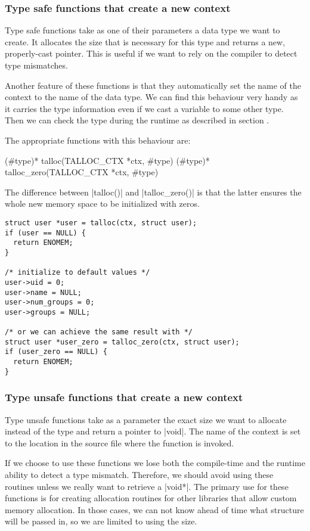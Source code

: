 \subsubsection{Type safe functions that create a new context}

Type safe functions take as one of their parameters a data type we want to
create. It allocates the size that is necessary for this type and returns a
new, properly-cast pointer. This is useful if we want to rely on the compiler
to detect type mismatches.

Another feature of these functions is that they automatically set the name of
the context to the name of the data type. We can find this behaviour very handy
as it carries the type information even if we cast a variable to some other
type. Then we can check the type during the runtime as described in section
.

The appropriate functions with this behaviour are:

\begin{funcproto}
(#type)* talloc(TALLOC_CTX *ctx, #type)
(#type)* talloc_zero(TALLOC_CTX *ctx, #type)
\end{funcproto}
\funclistend
The difference between |talloc()| and |talloc_zero()| is that the latter ensures
the whole new memory space to be initialized with zeros.

\begin{lstlisting}[caption={talloc() and talloc_zero()},label=lst:talloc_zero]
struct user *user = talloc(ctx, struct user);
if (user == NULL) {
  return ENOMEM;
}

/* initialize to default values */
user->uid = 0;
user->name = NULL;
user->num_groups = 0;
user->groups = NULL;

/* or we can achieve the same result with */
struct user *user_zero = talloc_zero(ctx, struct user);
if (user_zero == NULL) {
  return ENOMEM;
}
\end{lstlisting}

\subsubsection{Type unsafe functions that create a new context}

Type unsafe functions take as a parameter the exact size we want to allocate
instead of the type and return a pointer to |void|. The name of the context
is set to the location in the source file where the function is invoked.

If we choose to use these functions we lose both the compile-time and the
runtime ability to detect a type mismatch. Therefore, we should avoid using
these routines unless we really want to retrieve a |void*|. The primary use for
these functions is for creating allocation routines for other libraries that
allow custom memory allocation. In those cases, we can not know ahead of time
what structure will be passed in, so we are limited to using the size.

